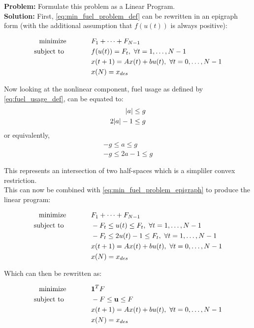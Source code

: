 \documentclass[letter]{article}
\newcommand{\optpblm}[3][eq:default]{
	\begin{equation}\label{#1}
		\begin{aligned}
			\text{minimize} \hspace{0.5in} &#2\vspace{5pt}\\
			\text{subject to \hspace{0.5in}} &#3
		\end{aligned}	
	\end{equation}
}
\begin{document}
\textbf{Problem:}
Formulate this problem as a Linear Program.\\

\textbf{Solution:}
First, \ref{eq:min_fuel_problem_def} can be rewritten in an epigraph form (with the additional assumption that $f(u(t))$ is always positive):
\optpblm[eq:min_fuel_problem_epigraph]{F_1 + \cdots + F_{N-1}}{
		f(u(t)) = F_t, \ \forall t = 1, \dots, N-1\\
		& x(t+1) = A x(t) + b u(t), \ \forall t = 0,\dots,N-1\\
		&x(N) = x_{des}}
Now looking at the nonlinear component, fuel usage as defined by \eqref{eq:fuel_usage_def}, can be equated to:
\begin{equation}
	\begin{aligned}
		\abs{a} \leq g\\
		2 \abs{a} - 1 \leq g\\
	\end{aligned}
\end{equation}
or equivalently,
\begin{equation}
	\begin{aligned}
		-g \leq a \leq g\\
		-g \leq 2a -1 \leq g
	\end{aligned}
\end{equation}

This represents an intersection of two half-spaces which is a simpliler convex restriction.\\
This can now be combined with \eqref{eq:min_fuel_problem_epigraph} to produce the linear program:
\optpblm[eq:min_fuel_problem_result]{F_1 + \cdots + F_{N-1}}{
	-F_t \leq u(t) \leq F_t, \ \forall t = 1, \dots, N-1\\
	&-F_t \leq 2u(t) -1 \leq F_t, \ \forall t = 1, \dots, N-1\\
	& x(t+1) = A x(t) + b u(t), \ \forall t = 0,\dots,N-1\\
	&x(N) = x_{des}}
Which can then be rewritten as:
\optpblm[eq:min_fuel_problem_result]{\vb{1}^T F}{
		-F \leq \vb{u} \leq F\\
		& x(t+1) = A x(t) + b u(t), \ \forall t = 0,\dots,N-1\\
		&x(N) = x_{des}}


\newpage
\end{document}
